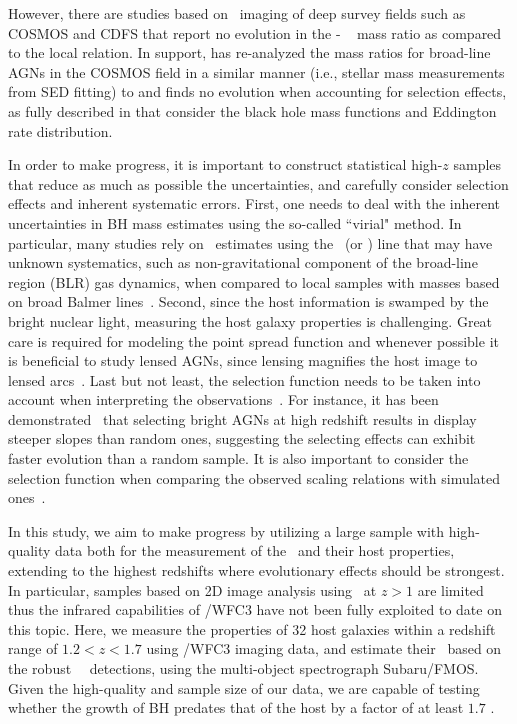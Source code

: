 \documentclass[apj]{emulateapj}
\begin{document}
However, there are studies \citep{Cisternas2011,SS13,Mechtley2016} based on \hst\  imaging of deep survey fields such as COSMOS and CDFS that report no evolution in the \mbh - \smass ~ mass ratio as compared to the local relation. In support, \citet{Sun2015} has re-analyzed the mass ratios for broad-line AGNs in the COSMOS field in a similar manner (i.e., stellar mass measurements from SED fitting) to \citet{Merloni2010} and finds no evolution when accounting for selection effects, as fully described in \citet{Schulze2014} that consider the black hole mass functions and Eddington rate distribution. 

In order to make progress, it is important to construct statistical high-$z$ samples that reduce as much as possible the uncertainties, and carefully consider selection effects and inherent systematic errors. First, one needs to deal with the inherent uncertainties in BH mass estimates using the so-called ``virial" method. In particular, many studies rely on \mbh\ estimates using the \Civ\ (or \Mgii) line that may have unknown systematics, such as non-gravitational component of the broad-line region (BLR) gas dynamics, when compared to local samples with masses based on broad Balmer lines~\citep[i.e. \halpha\ and \hbeta,][]{Schulze2018, Baskin2005, Trakhtenbrot2012}. Second, since the host information is swamped by the bright nuclear light, measuring the host galaxy properties is challenging. Great care is required for modeling the point spread function and whenever possible it is beneficial to study lensed AGNs, since lensing magnifies the host image to lensed arcs~\citep{Pen++06qsob, Ding2017a, Ding2017b}. Last but not least, the selection function needs to be taken into account when interpreting the observations~\citep{Treu2007, Lauer2007}. For instance, it has been demonstrated~\citep{Schulze2011, Schulze2014} that selecting bright AGNs at high redshift results in display steeper slopes than random ones, suggesting the selecting effects can exhibit faster evolution than a random sample. It is also important to consider the selection function when comparing the observed scaling relations with simulated ones~\citep{DeG++15}.

 
In this study, we aim to make progress by utilizing a large sample with high-quality data both for the measurement of the \mbh\ and their host properties, extending to the highest redshifts where evolutionary effects should be strongest. In particular, samples based on 2D image analysis using \hst\ at $z>1$ are limited thus the infrared capabilities of \hst/WFC3 have not been fully exploited to date on this topic. Here, we measure the properties of 32 host galaxies within a redshift range of $1.2<z<1.7$ using \hst/WFC3 imaging data, and estimate their \mbh\ based on the robust \halpha\ ~detections, using the multi-object spectrograph Subaru/FMOS. Given the high-quality and sample size of our data, we are capable of testing whether the growth of BH predates that of the host by a factor of at least $1.7$ \citep[i.e. $\sim0.23$ dex,][]{Schulze2014}.
\end{document}
